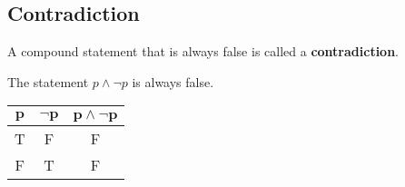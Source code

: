 \documentclass[../notes.tex]{subfiles}
\begin{document}
			\subsection{Contradiction}
				A compound statement that is always false is called a \textbf{contradiction}.
				\begin{examplebox}
					The statement $p \land \lnot p$ is always false.
					\begin{center}
						\begin{tabular}{| c c | c |}
							\hline
							$\mathbf{p}$ & $\mathbf{\lnot p}$ & $\mathbf{p \land \lnot p}$\\
							\hline
							T & F & F\\
							F & T & F\\
							\hline
						\end{tabular}
					\end{center}
				\end{examplebox}
\end{document}
